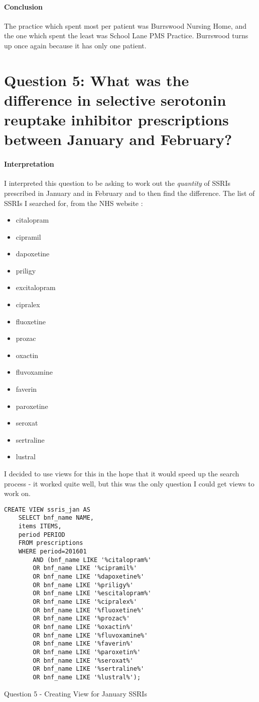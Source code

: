 \documentclass{report}
\begin{document}
\paragraph{Conclusion}
The practice which spent most per patient was Burrswood Nursing Home, and the one which spent the least was School Lane PMS Practice. Burrswood turns up once again because it has only one patient.

\section{Question 5: What was the difference in selective serotonin reuptake inhibitor prescriptions between January and February?}

\paragraph{Interpretation}
I interpreted this question to be asking to work out the \textit{quantity} of SSRIs prescribed in January and in February and to then find the difference. The list of SSRIs I searched for, from the NHS website \cite{nhsssris}:
\begin{itemize}
\item citalopram
\item cipramil
\item dapoxetine
\item priligy
\item excitalopram
\item cipralex
\item fluoxetine
\item prozac
\item oxactin
\item fluvoxamine
\item faverin
\item paroxetine
\item seroxat
\item sertraline
\item lustral
\end{itemize}

I decided to use views for this in the hope that it would speed up the search process - it worked quite well, but this was the only question I could get views to work on.

\begin{listing}[H]
\begin{verbatim}
CREATE VIEW ssris_jan AS 
	SELECT bnf_name NAME, 
	items ITEMS, 
	period PERIOD 
	FROM prescriptions 
	WHERE period=201601 
		AND (bnf_name LIKE '%citalopram%' 
		OR bnf_name LIKE '%cipramil%' 
		OR bnf_name LIKE '%dapoxetine%' 
		OR bnf_name LIKE '%priligy%' 
		OR bnf_name LIKE '%escitalopram%' 
		OR bnf_name LIKE '%cipralex%' 
		OR bnf_name LIKE '%fluoxetine%' 
		OR bnf_name LIKE '%prozac%' 
		OR bnf_name LIKE '%oxactin%' 
		OR bnf_name LIKE '%fluvoxamine%' 
		OR bnf_name LIKE '%faverin%' 
		OR bnf_name LIKE '%paroxetin%' 
		OR bnf_name LIKE '%seroxat%' 
		OR bnf_name LIKE '%sertraline%' 
		OR bnf_name LIKE '%lustral%');
\end{verbatim}
\caption{Question 5 - Creating View for January SSRIs}
\label{lst: Q5-1}
\end{listing}
\end{document}
